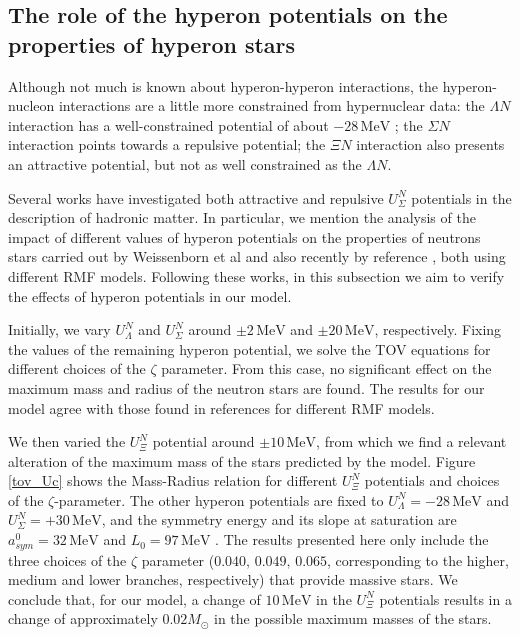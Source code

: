 \documentclass[twocolumn,showpacs,aps]{revtex4}
\begin{document}
 

\subsection{The role of the hyperon potentials on the properties of hyperon stars} \label{Upotentials_section}

Although not much is known about hyperon-hyperon interactions, the hyperon-nucleon interactions
are a little more constrained from hypernuclear data: the $\Lambda N$ interaction has a well-constrained potential
of about $- 28\, \mathrm{MeV}$
 ; the $\Sigma N$ interaction points towards a repulsive potential; the $\Xi N$ interaction
also presents an attractive potential, but not as well constrained as the $\Lambda N$.

Several works have investigated both attractive and repulsive $U_{\Sigma}^N$ potentials 
\cite{Knorren:1995ds,Schaffner:1995th,SchaffnerBielich:2008kb, Mi:2007zz, Negreiros:2010hk,Vasconcellos:2014qua} 
in the description of hadronic matter. In particular, we mention the analysis of the impact of different values of hyperon potentials on
the properties of neutrons stars carried out by Weissenborn et al \cite{Weissenborn:2011kb} and also recently by reference 
\cite{Bhowmick:2014pma}, both using different RMF models. 
Following these works, in this subsection we aim to verify the effects of hyperon potentials in our model.

Initially, we vary $U_{\Lambda}^N$ and $U_{\Sigma}^N$ around $\pm 2\, \mathrm{MeV}$
  and $\pm 20\, \mathrm{MeV}$, respectively.  
Fixing the values of the remaining hyperon potential, we solve the TOV equations for different choices of the $\zeta$ parameter.
From this case, no significant effect on the maximum mass and radius of the neutron stars are found.
The results for our model agree with those found in references \cite{Weissenborn:2011kb,Bhowmick:2014pma} for different RMF models. 

 
We then varied the $U_{\Xi}^N$ potential around $\pm 10\, \mathrm{MeV}$, from which we find a relevant alteration of the maximum mass
of the stars predicted by the model.
Figure \ref{tov_Uc} shows the Mass-Radius relation for different $U_{\Xi}^N$ potentials and choices of the $\zeta$-parameter. 
The other hyperon potentials are fixed to $U_{\Lambda}^N=-28 \,\mathrm{MeV}$ and $U_{\Sigma}^N=+30\,\mathrm{MeV} $, and the symmetry energy and its slope 
at saturation are $a_{sym}^0= 32\, \mathrm{MeV}$
  and $L_0=97\, \mathrm{MeV}$
 .
The results presented here only include the three choices of the $\zeta$ parameter ($0.040,\,0.049,\,0.065$, corresponding to the
higher, medium and lower branches, respectively) that provide massive stars.
We conclude that, for our model, a change of $10\,\mathrm{MeV}$ in the $U_{\Xi}^N$ potentials results in a change of approximately $0.02M_{\odot}$
in the possible maximum masses of the stars.
\end{document}

